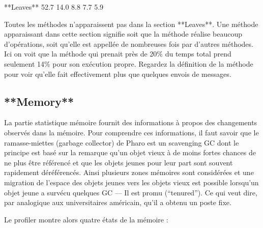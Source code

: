 \documentclass[a4paper,10pt,twoside]{book}
\begin{document}
\begin{small}
\begin{sf}
**Leaves**
52.7%
14.0%
8.8%
7.7%
5.9%
\end{sf}
\end{small}


Toutes les m\'ethodes n'apparaissent pas dans la section
**Leaves**. Une m\'ethode apparaissant dans cette section signifie
soit que la m\'ethode r\'ealise beaucoup d'op\'erations, soit qu'elle
est appell\'ee de nombreuses fois par d'autres m\'ethodes.
Ici on voit que la m\'ethode  qui prenait
pr\`es de 20\% du temps total prend seulement 14\% pour son ex\'ecution
propre. Regardez la d\'efinition de la m\'ethode pour voir qu'elle
fait effectivement plus que quelques envois de messages. 


 \subsection{**Memory**}

La partie statistique m\'emoire fournit des informations \`a propos
des changements observ\'es dans la m\'emoire. 
Pour comprendre ces informations, il faut savoir que le
ramasse-miettes (garbage collector) de Pharo est
un scavenging GC dont le principe est bas\'e sur la
remarque qu'un objet vieux \`a de moins fortes chances de ne plus
\^etre r\'ef\'erenc\'e et que les objets jeunes pour leur part sont
souvent rapidement d\'er\'ef\'erenc\'es. Ainsi plusieurs zones
m\'emoires sont consid\'er\'ees et une migration de l'espace des
objets jeunes vers les objets vieux est possible lorsqu'un objet
jeune a surv\'ecu quelques GC --- Il est promu (``tenured''). Ce qui veut dire,
par analogique aux universitaires am\'ericain, qu'il a obtenu un poste
fixe. 

Le profiler montre alors quatre \'etats de la m\'emoire :
\end{document}
